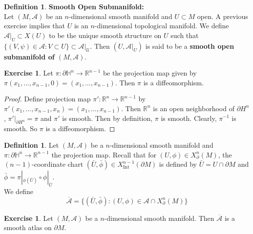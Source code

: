 \documentclass{book}
\theoremstyle{definition}
\newtheorem{defn}[definition]{Definition}
\newtheorem{ex}[definition]{Exercise}
\renewcommand{\H}{\mathbb{H}}
\newcommand{\R}{\mathbb{R}}
\newcommand{\MA}{\mathcal{A}}
\newcommand{\MU}{\mathcal{U}}
\DeclareMathOperator{\Int}{Int}
\DeclareMathOperator*{\0}{\mbf{0}}
\DeclareMathOperator*{\1}{\mbf{1}}
\newcommand{\tbf}[1]{\textbf{#1}}
\newcommand{\ol}[1]{\overline{#1}}
\newcommand{\p}{\partial}
\begin{document}
 	\begin{defn} \tbf{Smooth Open Submanifold:} \\
 		Let $(M, \MA)$ be an $n$-dimensional smooth manifold and $U \subset M$ open. A previous exercise implies that $U$ is an $n$-dimensional topological manifold. We define $\MA|_{U} \subset X(U)$ to be the unique smooth structure on $U$ such that $\{(V, \psi) \in \MA: V \subset U\} \subset \MA|_{\MU}$. Then $(U, \MA|_{U})$ is said to be a \tbf{smooth open submanifold of $(M, \MA)$}.
 	\end{defn}
 
 	\begin{ex}
 		Let $\pi: \p \H^n \rightarrow \R^{n-1}$ be the projection map given by $\pi(x_1, \ldots, x_{n-1}, 0) = (x_1, \ldots, x_{n-1})$. Then $\pi$ is a diffeomorphism. 
 	\end{ex}
 
 	\begin{proof}
 		Define projection map $\pi': \R^n \rightarrow \R^{n-1}$ by $\pi'(x_1, \ldots, x_{n-1}, x_n) = (x_1, \ldots, x_{n-1})$. Then $\R^n$ is an open neighborhood of $\p H^n$, $\pi'|_{\p H^n} = \pi$ and $\pi'$ is smooth. Then by definition, $\pi$ is smooth. Clearly, $\pi^{-1}$ is smooth. So $\pi$ is a diffeomorphism.
 	\end{proof}

	\begin{defn} 
		Let $(M, \MA)$ be a $n$-dimensional smooth manifold and $\pi: \p \H^n \rightarrow \R^{n-1}$ the projection map. Recall that for $(U, \phi) \in X^n_{\p}(M)$, the $(n-1)$-coordinate chart $(\bar{U}, \bar{\phi}) \in X^{n-1}_{\Int}(\p M)$ is defined by $\bar{U} = U \cap \p M$ and $\bar{\phi} = \pi|_{\phi(\bar{U})} \circ \phi|_{\bar{U}}$. \\
		We define 
		$$\ol{\MA} = \{(\bar{U}, \bar{\phi}): (U, \phi) \in \MA \cap X^n_{\p}(M) \}$$
	\end{defn}
	
	\begin{ex}
		Let $(M, \MA)$ be a $n$-dimensional smooth manifold. Then $\ol{\MA}$ is a smooth atlas on $\p M$.
	\end{ex}
	
\end{document}

